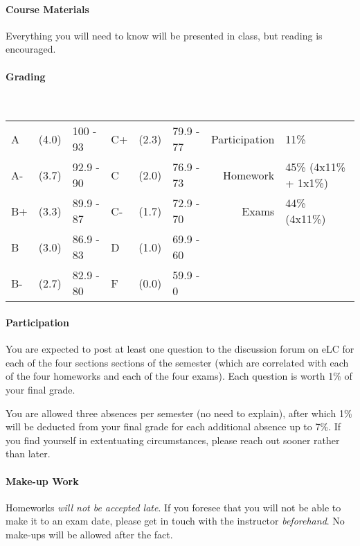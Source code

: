 \documentclass{article}
\begin{document}
  \paragraph{Course Materials}
    Everything you will need to know will be presented in class, but reading is encouraged.

  \paragraph{Grading} \mbox{}\\
    {\small
      \begin{tabular}{@{} l @{} l l l @{} l l | r l @{}}
        A   & (4.0) & 100 - 93  & C+  & (2.3) & 79.9 - 77 & Participation & 11\%\\
        A-  & (3.7) & 92.9 - 90 & C   & (2.0) & 76.9 - 73 & Homework      & 45\% (4x11\% + 1x1\%)\\
        B+  & (3.3) & 89.9 - 87 & C-  & (1.7) & 72.9 - 70 & Exams         & 44\% (4x11\%)\\
        B   & (3.0) & 86.9 - 83 & D   & (1.0) & 69.9 - 60 & \\
        B-  & (2.7) & 82.9 - 80 & F   & (0.0) & 59.9 - 0  & \\
      \end{tabular}
    }

  \paragraph{Participation}
    You are expected to post at least one question to the discussion forum on eLC for each of the four sections sections of the semester (which are correlated with each of the four homeworks and each of the four exams). Each question is worth 1\% of your final grade.

    You are allowed three absences per semester (no need to explain), after which 1\% will be deducted from your final grade for each additional absence up to 7\%. If you find yourself in extentuating circumstances, please reach out sooner rather than later.

  \paragraph{Make-up Work}
    Homeworks \emph{will not be accepted late}. If you foresee that you will not be able to make it to an exam date, please get in touch with the instructor \emph{beforehand}. No make-ups will be allowed after the fact.
\end{document}
